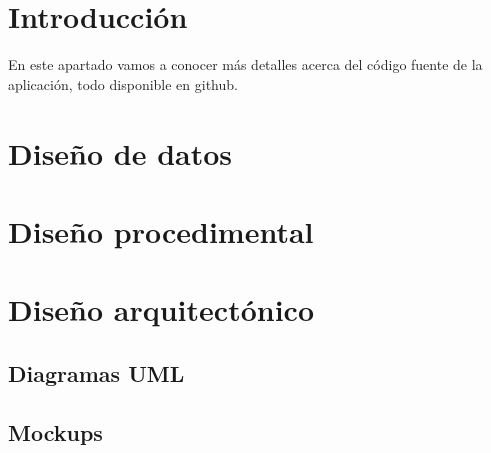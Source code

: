 
\section{Introducción}\label{introduccion-diseño}
En este apartado vamos a conocer más detalles acerca del código fuente de la aplicación, todo disponible en github. 

\section{Diseño de datos}\label{diseno-fatos}

\section{Diseño procedimental}\label{diseno-procedimental}

\section{Diseño arquitectónico}\label{diseno-arquitectura}
\subsection{Diagramas UML}\label{diagramas-uml}
\subsection{Mockups}\label{Mockups}




